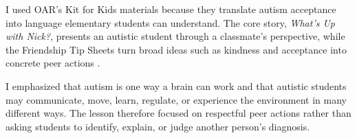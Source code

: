 
I used OAR's Kit for Kids materials because they translate autism acceptance into language elementary students can understand. The core story, \textit{What's Up with Nick?}, presents an autistic student through a classmate's perspective, while the Friendship Tip Sheets turn broad ideas such as kindness and acceptance into concrete peer actions \citep{oar2026kit,oar2026nick,oar2026tips}.

I emphasized that autism is one way a brain can work and that autistic students may communicate, move, learn, regulate, or experience the environment in many different ways. The lesson therefore focused on respectful peer actions rather than asking students to identify, explain, or judge another person's diagnosis.